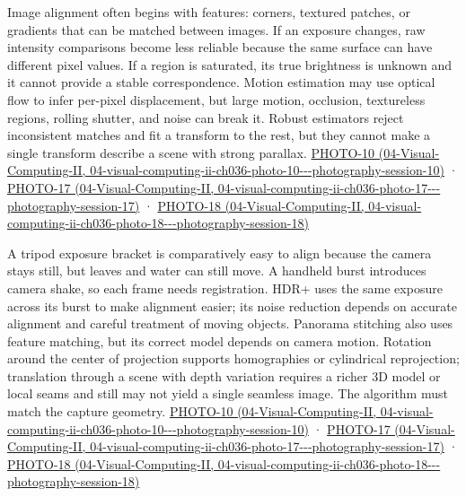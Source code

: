 Image alignment often begins with features: corners, textured patches, or gradients that can be matched between images. If an exposure changes, raw intensity comparisons become less reliable because the same surface can have different pixel values. If a region is saturated, its true brightness is unknown and it cannot provide a stable correspondence. Motion estimation may use optical flow to infer per-pixel displacement, but large motion, occlusion, textureless regions, rolling shutter, and noise can break it. Robust estimators reject inconsistent matches and fit a transform to the rest, but they cannot make a single transform describe a scene with strong parallax. \href{../04-Visual-Computing-II/main.pdf\#nameddest=04-visual-computing-ii-ch036-photo-10---photography-session-10}{PHOTO-10 (04-Visual-Computing-II, 04-visual-computing-ii-ch036-photo-10-\/-\/-photography-session-10)} · \href{../04-Visual-Computing-II/main.pdf\#nameddest=04-visual-computing-ii-ch036-photo-17---photography-session-17}{PHOTO-17 (04-Visual-Computing-II, 04-visual-computing-ii-ch036-photo-17-\/-\/-photography-session-17)} · \href{../04-Visual-Computing-II/main.pdf\#nameddest=04-visual-computing-ii-ch036-photo-18---photography-session-18}{PHOTO-18 (04-Visual-Computing-II, 04-visual-computing-ii-ch036-photo-18-\/-\/-photography-session-18)}

A tripod exposure bracket is comparatively easy to align because the camera stays still, but leaves and water can still move. A handheld burst introduces camera shake, so each frame needs registration. HDR+ uses the same exposure across its burst to make alignment easier; its noise reduction depends on accurate alignment and careful treatment of moving objects. Panorama stitching also uses feature matching, but its correct model depends on camera motion. Rotation around the center of projection supports homographies or cylindrical reprojection; translation through a scene with depth variation requires a richer 3D model or local seams and still may not yield a single seamless image. The algorithm must match the capture geometry. \href{../04-Visual-Computing-II/main.pdf\#nameddest=04-visual-computing-ii-ch036-photo-10---photography-session-10}{PHOTO-10 (04-Visual-Computing-II, 04-visual-computing-ii-ch036-photo-10-\/-\/-photography-session-10)} · \href{../04-Visual-Computing-II/main.pdf\#nameddest=04-visual-computing-ii-ch036-photo-17---photography-session-17}{PHOTO-17 (04-Visual-Computing-II, 04-visual-computing-ii-ch036-photo-17-\/-\/-photography-session-17)} · \href{../04-Visual-Computing-II/main.pdf\#nameddest=04-visual-computing-ii-ch036-photo-18---photography-session-18}{PHOTO-18 (04-Visual-Computing-II, 04-visual-computing-ii-ch036-photo-18-\/-\/-photography-session-18)}

